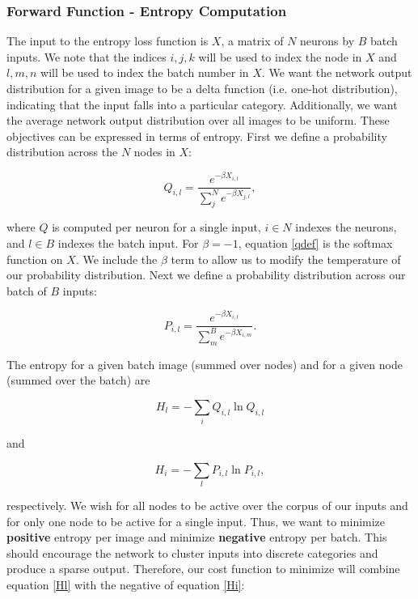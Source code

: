 \documentclass[smallextended]{svjour3}       %
\begin{document}
\subsubsection{Forward Function - Entropy Computation} \label{entropy_forward}
\noindent The input to the entropy loss function is $X$, a matrix of $N$ neurons by $B$ batch inputs. We note that the indices $i, j, k$ will be used to index the node in $X$ and $l,m,n$ will be used to index the batch number in $X$. We want the network output distribution for a given image to be a delta function (i.e. one-hot distribution), indicating that the input falls into a particular category. Additionally, we want the average network output distribution over all images to be uniform. These objectives can be expressed in terms of entropy. First we define a probability distribution across the $N$ nodes in $X$:

\begin{equation} \label{qdef}
    Q_{i,l} = \frac{e^{-\beta X_{i,l}}}{\sum_{j}^{N} e^{-\beta X_{j,l}}},
\end{equation}

\noindent where $Q$ is computed per neuron for a single input, $i \in N$ indexes the neurons, and $l \in B$ indexes the batch input. For $\beta = -1$, equation \ref{qdef} is the softmax function on $X$. We include the $\beta$ term to allow us to modify the temperature of our probability distribution. Next we define a probability distribution across our batch of $B$ inputs:

\begin{equation} \label{pdef}
    P_{i,l} = \frac{e^{-\beta X_{i,l}}}{\sum_{m}^{B} e^{-\beta X_{i,m}}}.
\end{equation}

\noindent The entropy for a given batch image (summed over nodes) and for a given node (summed over the batch) are

\begin{equation} \label{Hl}
    H_{l} = -\sum_{i} Q_{i,l} \ln Q_{i,l}
\end{equation}

\noindent and

\begin{equation} \label{Hi}
    H_{i} = -\sum_{l} P_{i,l} \ln P_{i,l},
\end{equation}

\noindent respectively. We wish for all nodes to be active over the corpus of our inputs and for only one node to be active for a single input. Thus, we want to minimize \textbf{positive} entropy per image and minimize \textbf{negative} entropy per batch. This should encourage the network to cluster inputs into discrete categories and produce a sparse output. Therefore, our cost function to minimize will combine equation \ref{Hl} with the negative of equation \ref{Hi}:
\end{document}
